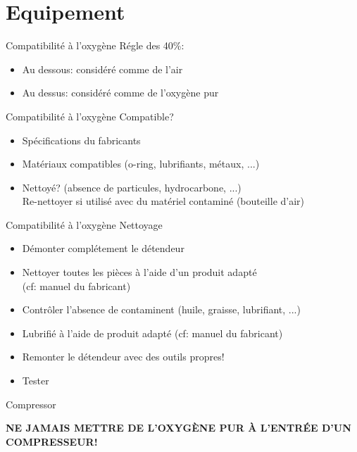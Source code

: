 
\section{Equipement}

\begin{frame}{Compatibilité à l'oxygène}  
	Régle des 40\%:
	\begin{itemize}
		\item Au dessous: considéré comme de l'air
		\item Au dessus: considéré comme de l'oxygène pur
	\end{itemize}
\end{frame}

\begin{frame}{Compatibilité à l'oxygène}  
	Compatible?
	\begin{itemize}
		\item Spécifications du fabricants
		\item Matériaux compatibles (o-ring, lubrifiants, métaux, ...)
		\item Nettoyé? (absence de particules, hydrocarbone, ...)\\
				Re-nettoyer si utilisé avec du matériel contaminé (bouteille d'air)
	\end{itemize}
\end{frame}

\begin{frame}{Compatibilité à l'oxygène}  
	Nettoyage
	\begin{itemize}
		\item Démonter complétement le détendeur
		\item Nettoyer toutes les pièces à l'aide d'un produit adapté\\(cf: manuel du fabricant)
		\item Contrôler l'absence de contaminent (huile, graisse, lubrifiant, ...)
		\item Lubrifié à l'aide de produit adapté (cf: manuel du fabricant)
		\item Remonter le détendeur avec des outils propres!
		\item Tester
	\end{itemize}
\end{frame}

\begin{frame}{Compressor}
	\begin{tcolorbox}[colback=white,colframe=mblue,title=ATTENTION]
		\centering\textbf{NE JAMAIS METTRE DE L'OXYGÈNE PUR À L'ENTRÉE D'UN COMPRESSEUR!}
	\end{tcolorbox}
\end{frame}